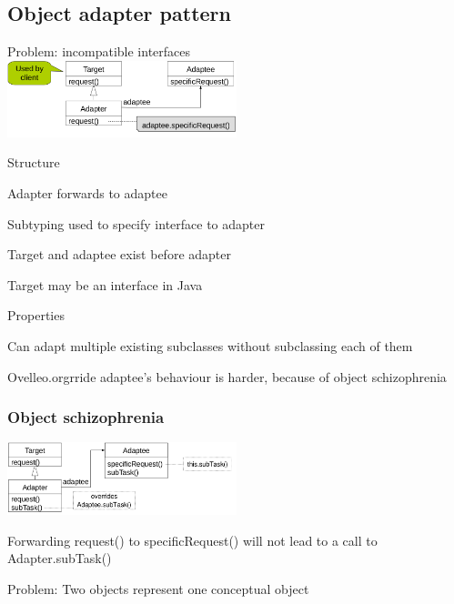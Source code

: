 \documentclass[10pt]{article}
\begin{document}
\subsection{Object adapter pattern}
\enumstart
	\item Problem: incompatible interfaces
	\\ \includegraphics[width=0.5\textwidth]{object_adapter_pattern.png}
	\item Structure
	\enumstart
		\item Adapter forwards to adaptee
		\item Subtyping used to specify interface to adapter
		\item Target and adaptee exist before adapter
		\item Target may be an interface in Java
	\enumend
	\item Properties
	\enumstart
		\item Can adapt multiple existing subclasses without subclassing each of them
		 \item Ovelleo.orgrride adaptee's behaviour is harder, because of object schizophrenia
	\enumend
\enumend

\subsubsection{Object schizophrenia}
\includegraphics[width=0.5\textwidth]{object_schizophrenia.png}
\enumstart
	\item Forwarding request() to specificRequest() will not lead to a call to Adapter.subTask()
	\item Problem: Two objects represent one conceptual object
\enumend
\end{document}
